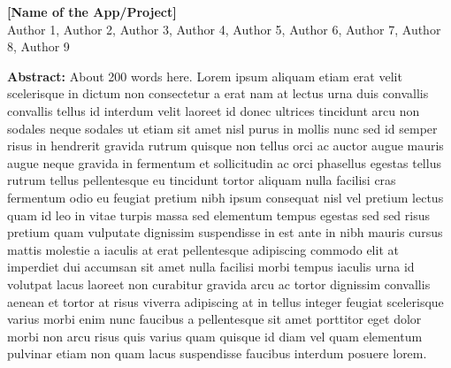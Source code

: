 \documentclass[12pt]{article}
\begin{document}
\begin{titlepage}
    \centering
    {\Huge \bfseries [Name of the App/Project]}\\[0.2cm]
    \vspace*{0.5cm}
    {\large Author 1, Author 2, Author 3, Author 4, Author 5, Author 6, Author 7, Author 8, Author 9}\\[2cm] %
    \vspace*{1cm}

    \begin{minipage}{0.9\textwidth}

        \textbf{Abstract:} About 200 words here. Lorem ipsum aliquam
        etiam erat velit scelerisque in dictum non consectetur a erat nam at lectus
        urna duis convallis convallis tellus id interdum velit laoreet id donec
        ultrices tincidunt arcu non sodales neque sodales ut etiam sit amet nisl
        purus in mollis nunc sed id semper risus in hendrerit gravida rutrum
        quisque non tellus orci ac auctor augue mauris augue neque gravida in
        fermentum et sollicitudin ac orci phasellus egestas tellus rutrum tellus
        pellentesque eu tincidunt tortor aliquam nulla facilisi cras fermentum odio
        eu feugiat pretium nibh ipsum consequat nisl vel pretium lectus quam id leo
        in vitae turpis massa sed elementum tempus egestas sed sed risus pretium
        quam vulputate dignissim suspendisse in est ante in nibh mauris cursus
        mattis molestie a iaculis at erat pellentesque adipiscing commodo elit at
        imperdiet dui accumsan sit amet nulla facilisi morbi tempus iaculis urna id
        volutpat lacus laoreet non curabitur gravida arcu ac tortor dignissim
        convallis aenean et tortor at risus viverra adipiscing at in tellus integer
        feugiat scelerisque varius morbi enim nunc faucibus a pellentesque sit amet
        porttitor eget dolor morbi non arcu risus quis varius quam quisque id diam
        vel quam elementum pulvinar etiam non quam lacus suspendisse faucibus
        interdum posuere lorem.

    \end{minipage}
\end{titlepage}
\thispagestyle{fancy}

\newpage

\tableofcontents
\thispagestyle{empty}

\newpage

\setcounter{page}{1}
\end{document}
